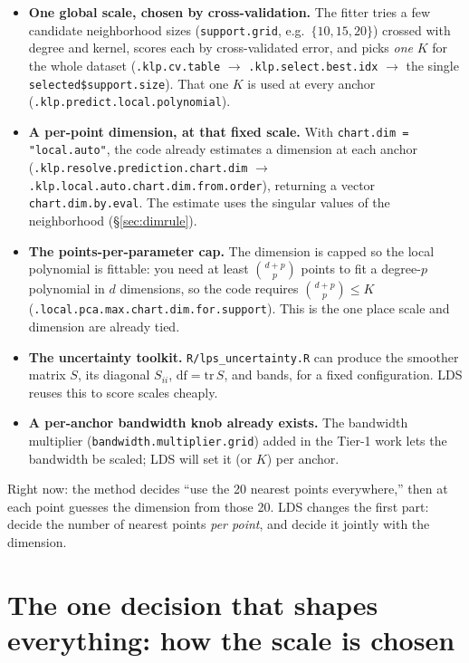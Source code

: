 \documentclass[11pt]{article}
\newcommand{\code}[1]{\texttt{#1}}
\begin{document}
\begin{itemize}[leftmargin=1.4em]
\item \textbf{One global scale, chosen by cross-validation.} The fitter tries a few
candidate neighborhood sizes (\code{support.grid}, e.g.\ $\{10,15,20\}$) crossed with
degree and kernel, scores each by cross-validated error, and picks \emph{one}
$K$ for the whole dataset (\code{.klp.cv.table} $\to$ \code{.klp.select.best.idx} $\to$
the single \code{selected\$support.size}). That one $K$ is used at every anchor
(\code{.klp.predict.local.polynomial}).
\item \textbf{A per-point dimension, at that fixed scale.} With
\code{chart.dim = "local.auto"}, the code already estimates a dimension at each anchor
(\code{.klp.resolve.prediction.chart.dim} $\to$
\code{.klp.local.auto.chart.dim.from.order}), returning a vector
\code{chart.dim.by.eval}. The estimate uses the singular values of the neighborhood
(\S\ref{sec:dimrule}).
\item \textbf{The points-per-parameter cap.} The dimension is capped so the local
polynomial is fittable: you need at least $\binom{d+p}{p}$ points to fit a degree-$p$
polynomial in $d$ dimensions, so the code requires $\binom{d+p}{p}\le K$
(\code{.local.pca.max.chart.dim.for.support}). This is the one place scale and
dimension are already tied.
\item \textbf{The uncertainty toolkit.} \code{R/lps\_uncertainty.R} can produce the
smoother matrix $S$, its diagonal $S_{ii}$, $\mathrm{df}=\mathrm{tr}\,S$, and bands,
for a fixed configuration. LDS reuses this to score scales cheaply.
\item \textbf{A per-anchor bandwidth knob already exists.} The bandwidth multiplier
(\code{bandwidth.multiplier.grid}) added in the Tier-1 work lets the bandwidth be
scaled; LDS will set it (or $K$) per anchor.
\end{itemize}

\begin{plain}
Right now: the method decides ``use the 20 nearest points everywhere,'' then at each
point guesses the dimension from those 20. LDS changes the first part: decide the
number of nearest points \emph{per point}, and decide it jointly with the dimension.
\end{plain}

\section{The one decision that shapes everything: how the scale is chosen}\label{sec:fork}
\end{document}
